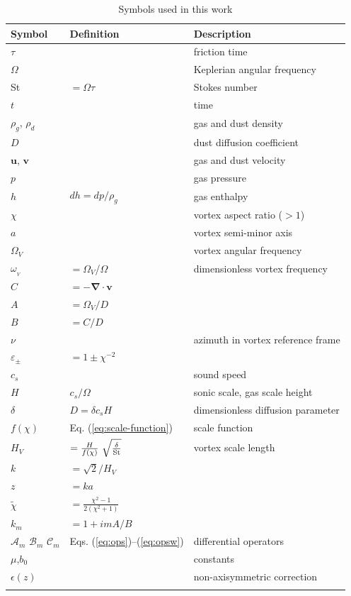 \documentclass[apj]{emulateapj}
\renewcommand{\v}[1]{{\boldsymbol{#1}}} %
\newcommand{\del}{\v{\nabla}}
\newcommand{\Div}{\del\cdot}
\newcommand{\Eq}[1]{Eq. (\ref{#1})}
\newcommand{\Eqss}[2]{Eqs. (\ref{#1})--(\ref{#2})}
\newcommand{\eq}[1]{\Eq{#1}}
\newcommand{\eqss}[2]{\Eqss{#1}{#2}}
\newcommand{\St}{{\rm St}}
\begin{document}
\begin{table}
\caption[]{Symbols used in this work}
\label{table:symbols}
\begin{center}
\begin{tabular}{l l l}\hline
Symbol & Definition & Description \\\hline
$\tau$ && friction time\\
$\varOmega$ & & Keplerian angular frequency \\
\St & $= \varOmega \tau$ & Stokes number \\
$t$ &  & time \\
$\rho_g$, $\rho_d$  & & gas and dust density\\
$D$ & & dust diffusion coefficient \\
$\v{u}$, $\v{v}$ & & gas and dust velocity\\
$p$ && gas pressure \\
$h$ &$dh=dp/\rho_g$ & gas enthalpy\\
$\chi$ & & vortex aspect ratio ($>1$) \\
$a$ & & vortex semi-minor axis \\
$\varOmega_V$ & & vortex angular frequency \\
$\omega_{_V}$ &  $=\varOmega_V$/$\varOmega$ & dimensionless vortex frequency  \\
$C$ & $=-\Div{\v{v}}$ &  \\
$A$ & $=\varOmega_V/D$ & \\
$B$  &$=C/D$ & \\
$\nu$ & & azimuth in vortex reference frame\\
$\varepsilon_\pm$ & $ = 1\pm\chi^{-2}$ \\
$c_s$ & & sound speed \\
$H$ & $c_s/\varOmega$ & sonic scale, gas scale height\\
$\delta$ & $D=\delta c_s H$ & dimensionless diffusion parameter\\
$f(\chi)$ & \eq{eq:scale-function} & scale function \\
$H_V$ & $=\frac{H}{f(\chi)} \ \sqrt{\frac{\delta}{\St}}$ & vortex scale length \\
$k$ & $=\sqrt{2}/H_V$ & \\ 
$z$ & $=ka$ & \\
$\tilde\chi$ & $=\frac{\chi^2-1}{2(\chi^2+1)}$ & \\
$k_m$ & $= 1+imA/B$ & \\
$\mathcal{A}_m$ $\mathcal{B}_m$ $\mathcal{C}_m$  &\eqss{eq:ops}{eq:opsw} & differential operators \\
$\mu$,$b_0$ & & constants\\
$\epsilon(z)$ & & non-axisymmetric correction \\
 & & \\ \hline
\end{tabular}
\end{center}
\end{table}
\end{document}
